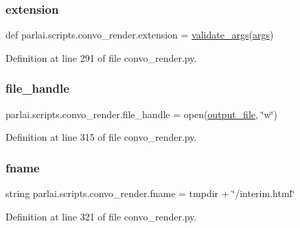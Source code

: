 \subsubsection{\texorpdfstring{extension}{extension}}
{\footnotesize\ttfamily def parlai.\+scripts.\+convo\+\_\+render.\+extension = \hyperlink{namespaceparlai_1_1scripts_1_1convo__render_a4078a037f4f5526297e7860fbed9cfb2}{validate\+\_\+args}(\hyperlink{namespaceparlai_1_1scripts_1_1convo__render_a9db4d889d4ee08e848b2c0526120483b}{args})}



Definition at line 291 of file convo\+\_\+render.\+py.

\mbox{\label{namespaceparlai_1_1scripts_1_1convo__render_aaf6f8cf81ac771e9724478dd77c5b82b}} 
\subsubsection{\texorpdfstring{file\+\_\+handle}{file\_handle}}
{\footnotesize\ttfamily parlai.\+scripts.\+convo\+\_\+render.\+file\+\_\+handle = open(\hyperlink{namespaceparlai_1_1scripts_1_1convo__render_ad3c1d6fa9a8463d68b415f7a995db518}{output\+\_\+file}, \char`\"{}w\char`\"{})}



Definition at line 315 of file convo\+\_\+render.\+py.

\mbox{\label{namespaceparlai_1_1scripts_1_1convo__render_afdeec635d90f882f6f9c117a9cf62010}} 
\subsubsection{\texorpdfstring{fname}{fname}}
{\footnotesize\ttfamily string parlai.\+scripts.\+convo\+\_\+render.\+fname = tmpdir + \char`\"{}/interim.\+html\char`\"{}}



Definition at line 321 of file convo\+\_\+render.\+py.

